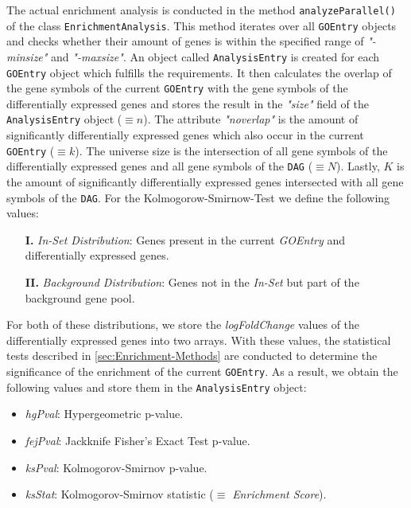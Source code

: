 \documentclass[12pt]{article}
\begin{document}
The actual enrichment analysis is conducted in the method \texttt{analyzeParallel()} of the
class \texttt{EnrichmentAnalysis}. This method iterates over all \texttt{GOEntry} objects
and checks whether their amount of genes is within the specified range of \textit{"-minsize"}
and \textit{"-maxsize"}. 
An object called \texttt{AnalysisEntry} is created for each \texttt{GOEntry} object which
fulfills the requirements.
It then calculates the overlap of the gene symbols of the current \texttt{GOEntry} with 
the gene symbols of the differentially expressed genes and stores the result 
in the \textit{"size"} field of the \texttt{AnalysisEntry} object ($\equiv n$).
The attribute \textit{"noverlap"} is the amount of significantly differentially expressed genes
which also occur in the current \texttt{GOEntry} ($\equiv k$). 
The universe size is the intersection of all gene symbols of the differentially expressed genes
and all gene symbols of the \texttt{DAG} ($\equiv N$). Lastly, $K$ is the amount of significantly
differentially expressed genes intersected with all gene symbols of the \texttt{DAG}.
For the Kolmogorow-Smirnow-Test we define the following values:
\begin{itemize}
    \item[\textbf{I.}] \textit{In-Set Distribution}: Genes present in the current \textit{GOEntry} and differentially expressed genes.
    \item[\textbf{II.}] \textit{Background Distribution}: Genes not in the \textit{In-Set} but part of the background gene pool.
\end{itemize}
For both of these distributions, we store the \textit{logFoldChange} values of the differentially
expressed genes into two arrays.
With these values, the statistical tests described in \ref{sec:Enrichment-Methods} are 
conducted to determine the significance of the enrichment of the current \texttt{GOEntry}. 
As a result, we obtain the following values and store them in the \texttt{AnalysisEntry} object:
\begin{itemize}
    \item \textit{hgPval}: Hypergeometric p-value.
    \item \textit{fejPval}: Jackknife Fisher's Exact Test p-value.
    \item \textit{ksPval}: Kolmogorov-Smirnov p-value.
    \item \textit{ksStat}: Kolmogorov-Smirnov statistic ($\equiv$ \textit{Enrichment Score}).
\end{itemize}
\hspace{1mm}\\
\end{document}
